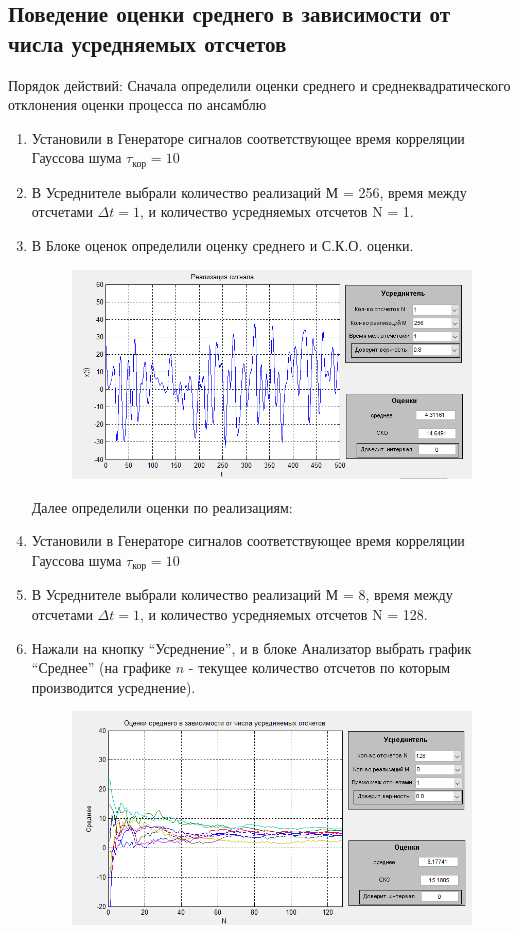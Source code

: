 \subsection[Задание 2]{Поведение оценки среднего в зависимости от числа усредняемых отсчетов}
Порядок действий:
Сначала определили оценки среднего и среднеквадратического отклонения оценки процесса по ансамблю
\begin{enumerate}
	\item Установили в Генераторе сигналов соответствующее время корреляции Гауссова шума $\tau_\text{кор} = 10$
	\item В Усреднителе выбрали количество реализаций М = 256, время между отсчетами $\Delta t = 1$, и количество усредняемых отсчетов N = 1.
	\item 	В Блоке оценок определили оценку среднего и С.К.О. оценки.	
	\begin{figure}[H]
		\centering
        \includegraphics[width=\linewidth]{fig/fig21}
	\end{figure}

	Далее определили оценки по реализациям:
	\item Установили в Генераторе сигналов соответствующее время корреляции Гауссова шума $\tau_\text{кор} = 10$
	\item В Усреднителе выбрали количество реализаций М = 8, время между отсчетами $\Delta t = 1$, и количество усредняемых отсчетов N = 128.
	\item Нажали на кнопку “Усреднение”, и в блоке Анализатор выбрать график “Среднее” (на графике $n$ - текущее количество отсчетов по которым производится усреднение).
	\begin{figure}[H]
		\centering
        \includegraphics[width=\linewidth]{fig/fig22}
	\end{figure}


\end{enumerate}
